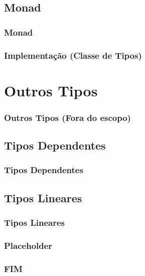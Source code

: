 \documentclass{beamer}
\begin{document}
\subsection{Monad}
\begin{frame}
    \frametitle{Monad}
\end{frame}

\begin{frame}
    \frametitle{Implementação (Classe de Tipos)}
\end{frame}

\section{Outros Tipos}
\begin{frame}
    \frametitle{Outros Tipos (Fora do escopo)}
\end{frame}

\subsection{Tipos Dependentes}
\begin{frame}
    \frametitle{Tipos Dependentes}
\end{frame}

\subsection{Tipos Lineares}
\begin{frame}
    \frametitle{Tipos Lineares}
\end{frame}

\begin{frame}
    \frametitle{Placeholder}
\end{frame}

\begin{frame}
    \frametitle{FIM}
\end{frame}
\end{document}
